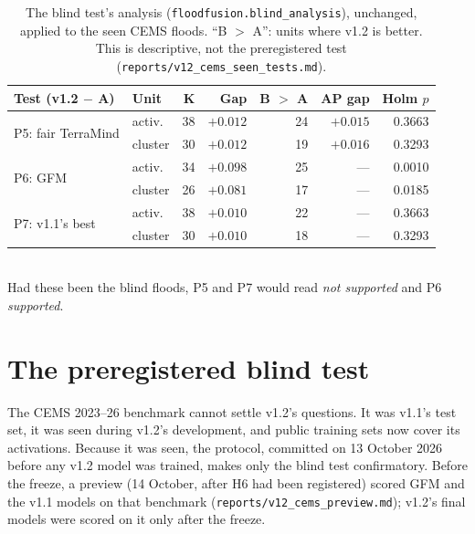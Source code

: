 \documentclass[10pt,twocolumn,a4paper]{article}
\newcommand{\file}[1]{\nolinkurl{#1}}
\begin{document}
\begin{table}[t]
\centering\small
\caption{The blind test's analysis (\file{floodfusion.blind_analysis}), unchanged, applied to the seen CEMS
floods. ``B $>$ A'': units where v1.2 is better. This is descriptive, not the preregistered test
(\file{reports/v12_cems_seen_tests.md}).}
\label{tab:seen}
\setlength{\tabcolsep}{2.5pt}
\begin{tabular}{@{}l l r r r r r@{}}
\toprule
Test (v1.2 $-$ A) & Unit & K & Gap & B $>$ A & AP gap & Holm $p$ \\
\midrule
\multirow{2}{*}{P5: fair TerraMind} & activ. & 38 & $+0.012$ & 24 & $+0.015$ & 0.3663 \\
                                    & cluster & 30 & $+0.012$ & 19 & $+0.016$ & 0.3293 \\
\multirow{2}{*}{P6: GFM}            & activ. & 34 & $+0.098$ & 25 & --- & 0.0010 \\
                                    & cluster & 26 & $+0.081$ & 17 & --- & 0.0185 \\
\multirow{2}{*}{P7: v1.1's best}    & activ. & 38 & $+0.010$ & 22 & --- & 0.3663 \\
                                    & cluster & 30 & $+0.010$ & 18 & --- & 0.3293 \\
\bottomrule
\end{tabular}
\\[3pt]
\footnotesize Had these been the blind floods, P5 and P7 would read \emph{not supported} and P6 \emph{supported}.
\end{table}

\section{The preregistered blind test}\label{sec:blind}
The CEMS 2023--26 benchmark cannot settle v1.2's questions. It was v1.1's test set, it was seen during v1.2's
development, and public training sets now cover its activations. Because it was seen, the protocol, committed on
13 October 2026 before any v1.2 model was trained, makes only the blind test confirmatory. Before the freeze, a
preview (14 October, after H6 had been registered) scored GFM and the v1.1 models on that benchmark
(\file{reports/v12_cems_preview.md}); v1.2's final models were scored on it only after the freeze.
\end{document}
